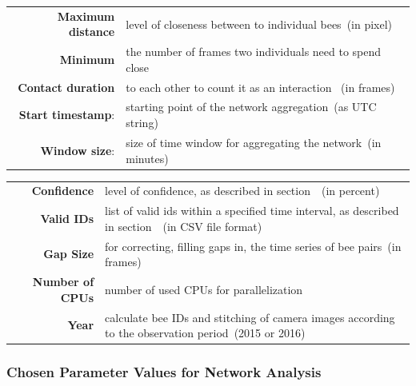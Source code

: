\begin{table}[htbp]
\centering
\begin{tabularx}{\textwidth}{@{} r Y @{}}
\textbf{Maximum distance} & level of closeness between to individual bees~(in pixel) \vspace{3mm} \\
\textbf{Minimum} & the number of frames two individuals need to spend close\\
\textbf{Contact duration} &  to each other to count it as an interaction ~(in frames) \vspace{3mm} \\
\textbf{Start timestamp}: & starting point of the network aggregation~(as UTC string) \vspace{3mm} \\
\textbf{Window size}: & size of time window for aggregating the network~(in minutes) \\
\end{tabularx}
\end{table}

\begin{table}[htbp]
\centering
\begin{tabularx}{\textwidth}{@{} r Y @{}}
\textbf{Confidence} & level of confidence, as described in section~~(in percent) \vspace{3mm}\\
\textbf{Valid IDs} & list of valid ids within a specified time interval, as described in section~~(in CSV file format) \vspace{3mm}\\
\textbf{Gap Size} & for correcting, filling gaps in, the time series of bee pairs~(in frames) \vspace{3mm}\\
\textbf{Number of CPUs} & number of used CPUs for parallelization \vspace{3mm}\\
\textbf{Year} & calculate bee IDs and stitching of camera images according to the observation period~(2015 or 2016)\\
\end{tabularx}
\end{table}

\subsubsection{Chosen Parameter Values for Network Analysis}

